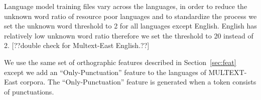Language model training files vary across the languages, in order to
reduce the unknown word ratio of resource poor languages and to
standardize the process we set the unknown word threshold to 2 for all
languages except English.  English has relatively low unknown word
ratio therefore we set the threshold to 20 instead of 2. [??double
  check for Multext-East English.??]

We use the same set of orthographic features described in
Section~\ref{sec:feat} except we add an ``Only-Punctuation'' feature
to the languages of MULTEXT-East corpora.  The ``Only-Punctuation''
feature is generated when a token consists of punctuations.

